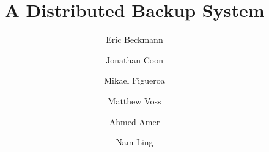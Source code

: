 \documentclass{scu-thesis}
\author{Eric Beckmann}
\author{Jonathan Coon}
\author{Mikael Figueroa}
\author{Matthew Voss}
\title{A Distributed Backup System}
\begin{document}
\frontmatter
\signature{Ahmed Amer}
\signature{Nam Ling}

\maketitle



\tableofcontents
\listoffigures

\mainmatter














\backmatter
\end{document}
